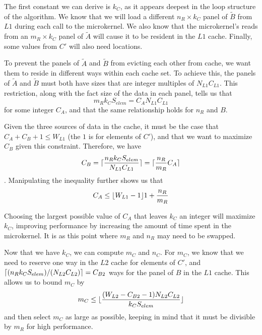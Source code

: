 \documentclass[12pt]{article}
\DeclarePairedDelimiter\ceil{\lceil}{\rceil}
\DeclarePairedDelimiter\floor{\lfloor}{\rfloor}
\begin{document}
The first constant we can derive is $k_C$, as it appears deepest in the loop structure of the algorithm.
We know that we will load a different $n_R \times k_C$ panel of $\tilde{B}$ from $L1$ during each call to the microkernel.
We also know that the microkernel's reads from an $m_R \times k_C$ panel of $\tilde{A}$ will cause it to be resident in the $L1$ cache.
Finally, some values from $C'$ will also need locations.

To prevent the panels of $\tilde{A}$ and $\tilde{B}$ from evicting each other from cache, we want them to reside in different ways within each cache set.
To achieve this, the panels of $\tilde{A}$ and $\tilde{B}$ must both have sizes that are integer multiples of $N_{L1}C_{L1}$.
This restriction, along with the fact size of the data in each panel, tells us that
\begin{equation*}
  m_Rk_CS_{elem} = C_AN_{L1}C_{L1}
\end{equation*}
for some integer $C_A$, and that the same relationship holds for $n_R$ and $B$.

Given the three sources of data in the cache, it must be the case that $C_A + C_B + 1 \leq W_{L1}$ (the $1$ is for elements of $C'$), and that we want to maximize $C_B$ given this constraint.
Therefore, we have
\begin{equation*}
  C_B = \ceil{\frac{n_Rk_CS_{elem}}{N_{L1}C_{L1}}} = \ceil{\frac{n_R}{m_R}C_A}
\end{equation*}.
Manipulating the inequality further shows us that
\begin{equation*}
  C_A \leq \floor{W_{L1} - 1}{1 + \frac{n_R}{m_R}}
\end{equation*}

Choosing the largest possible value of $C_A$ that leaves $k_C$ an integer will maximize $k_C$, improving performance by increasing the amount of time spent in the microkernel.
It is as this point where $m_R$ and $n_R$ may need to be swapped.

Now that we have $k_C$, we can compute $m_C$ and $n_C$.
For $m_C$, we know that we need to reserve one way in the $L2$ cache for elements of $C'$, and $\ceil{(n_Rk_CS_{elem})/(N_{L2}C_{L2})} = C_{B2}$ ways for the panel of $B$ in the $L1$ cache.
This allows us to bound $m_C$ by
\begin{equation*}
  m_C \leq \floor{\frac{(W_{L2} - C_{B2} - 1)N_{L2}C_{L2}}{k_CS_{elem}}}
\end{equation*}
and then select $m_C$ as large as possible, keeping in mind that it must be divisible by $m_R$ for high performance.
\end{document}
